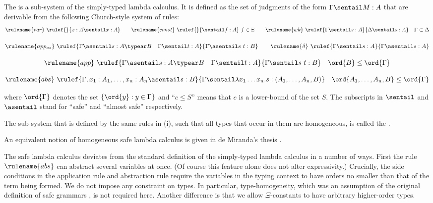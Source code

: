 \begin{definition}\rm
\label{def:safelambda}
\begin{inparaenum}[(i)]
\item The  is a sub-system of the
  simply-typed lambda calculus. It is defined as the set of judgments of the form $\Gamma \sentail M : A$ that are derivable from the following Church-style system of rules:
$$ \rulename{var} \ \rulef{}{x : A\sentail x : A} \qquad
\rulename{const} \ \rulef{}{\sentail f : A}~f \in \Xi \qquad
\rulename{wk} \ \rulef{\Gamma \sentail s : A}{\Delta \sentail s : A} \quad
\Gamma \subset \Delta$$

$$ \rulename{app_{as}} \ \rulef{\Gamma \asentail s : A\typear B
\quad \Gamma \sentail t : A} {\Gamma \asentail s~t : B}
\qquad
\rulename{\delta} \ \rulef{\Gamma \sentail s : A}{\Gamma \asentail s : A}
$$

$$ \rulename{app} \ \rulef{\Gamma \asentail s : A\typear B
\quad \Gamma \sentail t : A} {\Gamma \sentail s~t : B} \quad \ord{B} \leq
\ord{\Gamma}$$

$$ \rulename{abs} \ \rulef{\Gamma, x_1 : A_1, \ldots, x_n : A_n
  \asentail s : B} {\Gamma \sentail \lambda x_1 \ldots x_n . s :
  (A_1, \ldots ,A_n,B)} \quad \ord{A_1, \ldots ,A_n,B} \leq
\ord{\Gamma}$$
\smallskip

\noindent where $\ord{\Gamma}$ denotes the set $\{ \ord{y} : y \in
\Gamma \}$ and ``$c \leq S$'' means that $c$ is a lower-bound of the
set $S$. The subscripts in $\sentail$ and $\asentail$ stand for
``safe'' and ``almost safe'' respectively.

\noindent \item The sub-system that is defined by the same rules in
(i), such that all types that occur in them are homogeneous, is called
the .
\end{inparaenum}
\end{definition}
An equivalent notion of homogeneous safe lambda calculus is given in
de Miranda's thesis \cite{demirandathesis}.


The safe lambda calculus deviates from the standard definition of
the simply-typed lambda calculus in a number of ways. %
First the rule $\rulename{abs}$ can abstract several variables at once. (Of course this feature alone does not alter expressivity.) Crucially,
the side conditions in the application rule and abstraction rule
require the variables in the typing context to have orders no
smaller than that of the term being formed.  We do not impose any
constraint on types. In particular, type-homogeneity, which was an
assumption of the original definition of safe grammars \cite{KNU02},
is not required here. Another difference is that we allow
$\Xi$-constants to have
arbitrary higher-order types.  %

